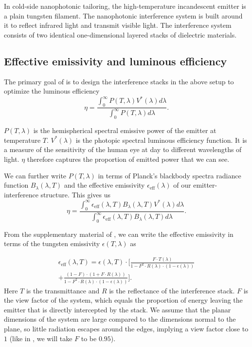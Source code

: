 \documentclass[%
 reprint,
 amsmath,amssymb,
 aps
]{revtex4-2}
\begin{document}
In cold-side nanophotonic tailoring, the high-temperature incandescent emitter is a plain tungsten filament. The nanophotonic interference system is built around it to reflect infrared light and transmit visible light. The interference system consists of two identical one-dimensional layered stacks of dielectric materials. 

\subsection{Effective emissivity and luminous efficiency}
The primary goal of \cite{ilic} is to design the interference stacks in the above setup to optimize the luminous efficiency \begin{equation}\eta = \frac{\int_0^{\infty} P(T, \lambda) V^*(\lambda) d\lambda}{\int_0^\infty P(T, \lambda) d\lambda}.\end{equation}

$P(T, \lambda)$ is the hemispherical spectral emissive power of the emitter at temperature $T$. $V^*(\lambda)$ is the photopic spectral luminous efficiency function. It is a measure of the sensitivity of the human eye at day to different wavelengths of light. $\eta$ therefore captures the proportion of emitted power that we can see.

We can further write $P(T, \lambda)$ in terms of Planck's blackbody spectra radiance function $B_\lambda (\lambda, T)$ and the effective emissivity $\epsilon_{\text{eff}}(\lambda)$ of our emitter-interference structure. This gives us \begin{equation}\label{eq:extended}\boxed{\eta = \frac{\int_0^{\infty} \epsilon_{\text{eff}} (\lambda, T) B_\lambda (\lambda, T) V^*(\lambda) d\lambda}{\int_0^{\infty} \epsilon_{\text{eff}} (\lambda, T) B_\lambda (\lambda, T) d\lambda}}.\end{equation}

From the supplementary material of \cite{ilic}, we can write the effective emissivity in terms of the tungsten emissivity $\epsilon(T, \lambda)$ as 

\begin{equation} \label{epseff}
\begin{multlined}
\epsilon_{\text{eff}}(\lambda, T) = \epsilon(\lambda, T)\cdot \bigg [ \frac{F \cdot T(\lambda)}{1 - F^2 \cdot R(\lambda)\cdot(1-\epsilon(\lambda))} \\+ \frac{(1-F)\cdot(1+F\cdot R(\lambda))}{1 - F^2 \cdot R(\lambda) \cdot (1-\epsilon(\lambda))} \bigg].
\end{multlined}
\end{equation}
Here $T$ is the transmittance and $R$ is the reflectance of the interference stack. $F$ is the view factor of the system, which equals the proportion of energy leaving the emitter that is directly intercepted by the stack. We assume that the planar dimensions of the system are large compared to the dimensions normal to the plane, so little radiation escapes around the edges, implying a view factor close to $1$ (like in \cite{ilic}, we will take $F$ to be $0.95$).
\end{document}
